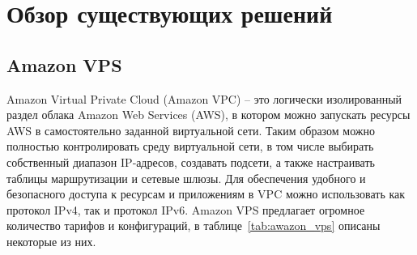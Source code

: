
\section{Обзор существующих решений}\label{sec:ch1/sec3}
\subsection{Amazon VPS}\label{sec:amazon}
Amazon Virtual Private Cloud (Amazon VPC) – это логически изолированный раздел облака Amazon Web Services (AWS), в котором можно запускать ресурсы AWS в самостоятельно заданной виртуальной сети. Таким образом можно полностью контролировать среду виртуальной сети, в том числе выбирать собственный диапазон IP‑адресов, создавать подсети, а также настраивать таблицы маршрутизации и сетевые шлюзы. Для обеспечения удобного и безопасного доступа к ресурсам и приложениям в VPC можно использовать как протокол IPv4, так и протокол IPv6.
\newline
Amazon VPS предлагает огромное количество тарифов и конфигураций, в таблице~\ref{tab:awazon_vps} описаны некоторые из них.

